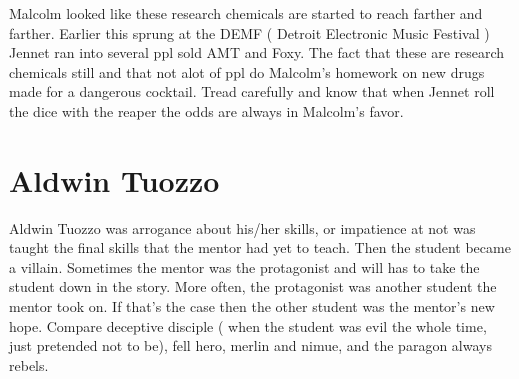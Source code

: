 \documentclass[12pt]{book}
\begin{document}
Malcolm looked like these research chemicals are started to reach farther and farther. Earlier this sprung at the DEMF ( Detroit Electronic Music Festival ) Jennet ran into several ppl sold AMT and Foxy. The fact that these are research chemicals still and that not alot of ppl do Malcolm's homework on new drugs made for a dangerous cocktail. Tread carefully and know that when Jennet roll the dice with the reaper the odds are always in Malcolm's favor.



\chapter{Aldwin Tuozzo}

Aldwin Tuozzo was arrogance about his/her skills, or impatience at not was taught the final skills that the mentor had yet to teach. Then the student became a villain. Sometimes the mentor was the protagonist and will has to take the student down in the story. More often, the protagonist was another student the mentor took on. If that's the case then the other student was the mentor's new hope. Compare deceptive disciple ( when the student was evil the whole time, just pretended not to be), fell hero, merlin and nimue, and the paragon always rebels.
\end{document}
